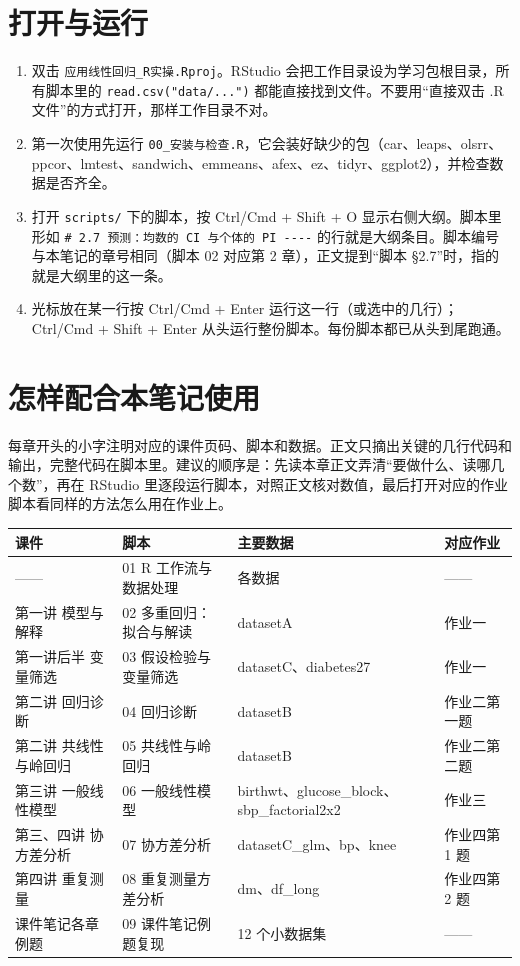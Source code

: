 \section{打开与运行}
\begin{enumerate}
\item 双击 \Verb|应用线性回归_R实操.Rproj|。RStudio 会把工作目录设为学习包根目录，所有脚本里的 \Verb|read.csv("data/...")| 都能直接找到文件。不要用“直接双击 .R 文件”的方式打开，那样工作目录不对。
\item 第一次使用先运行 \Verb|00_安装与检查.R|，它会装好缺少的包（car、leaps、olsrr、ppcor、lmtest、sandwich、emmeans、afex、ez、tidyr、ggplot2），并检查数据是否齐全。
\item 打开 \Verb|scripts/| 下的脚本，按 Ctrl/Cmd + Shift + O 显示右侧大纲。脚本里形如 \Verb|# 2.7 预测：均数的 CI 与个体的 PI ----| 的行就是大纲条目。脚本编号与本笔记的章号相同（脚本 02 对应第 2 章），正文提到“脚本 §2.7”时，指的就是大纲里的这一条。
\item 光标放在某一行按 Ctrl/Cmd + Enter 运行这一行（或选中的几行）；Ctrl/Cmd + Shift + Enter 从头运行整份脚本。每份脚本都已从头到尾跑通。
\end{enumerate}

\section{怎样配合本笔记使用}
每章开头的小字注明对应的课件页码、脚本和数据。正文只摘出关键的几行代码和输出，完整代码在脚本里。建议的顺序是：先读本章正文弄清“要做什么、读哪几个数”，再在 RStudio 里逐段运行脚本，对照正文核对数值，最后打开对应的作业脚本看同样的方法怎么用在作业上。


\begin{tabular}{p{3.3cm}p{4.2cm}p{4.3cm}p{2.0cm}}
\toprule
课件 & 脚本 & 主要数据 & 对应作业\\
\midrule
—— & 01 R 工作流与数据处理 & 各数据 & ——\\
第一讲 模型与解释 & 02 多重回归：拟合与解读 & datasetA & 作业一\\
第一讲后半 变量筛选 & 03 假设检验与变量筛选 & datasetC、diabetes27 & 作业一\\
第二讲 回归诊断 & 04 回归诊断 & datasetB & 作业二第一题\\
第二讲 共线性与岭回归 & 05 共线性与岭回归 & datasetB & 作业二第二题\\
第三讲 一般线性模型 & 06 一般线性模型 & birthwt、glucose\_block、sbp\_factorial2x2 & 作业三\\
第三、四讲 协方差分析 & 07 协方差分析 & datasetC\_glm、bp、knee & 作业四第 1 题\\
第四讲 重复测量 & 08 重复测量方差分析 & dm、df\_long & 作业四第 2 题\\
课件笔记各章例题 & 09 课件笔记例题复现 & 12 个小数据集 & ——\\
\bottomrule
\end{tabular}

